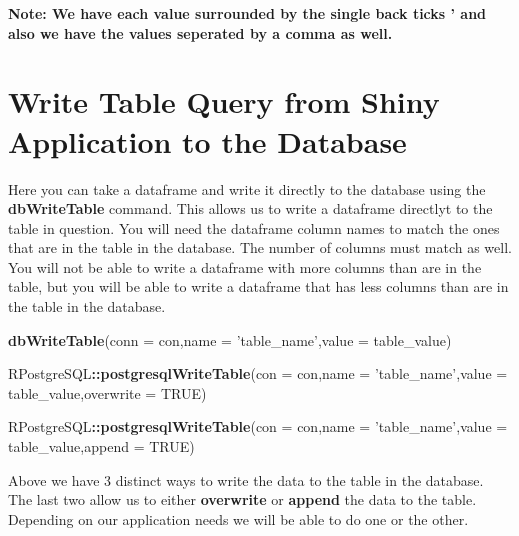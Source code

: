 \documentclass[]{book}
\newenvironment{Shaded}{\begin{snugshade}}{\end{snugshade}}
\newcommand{\KeywordTok}[1]{\textcolor[rgb]{0.13,0.29,0.53}{\textbf{#1}}}
\newcommand{\DataTypeTok}[1]{\textcolor[rgb]{0.13,0.29,0.53}{#1}}
\newcommand{\StringTok}[1]{\textcolor[rgb]{0.31,0.60,0.02}{#1}}
\newcommand{\OtherTok}[1]{\textcolor[rgb]{0.56,0.35,0.01}{#1}}
\newcommand{\OperatorTok}[1]{\textcolor[rgb]{0.81,0.36,0.00}{\textbf{#1}}}
\newcommand{\NormalTok}[1]{#1}
\begin{document}
\begin{Shaded}
\end{Shaded}

\textbf{Note: We have each value surrounded by the single back ticks '
and also we have the values seperated by a comma as well.}

\section{Write Table Query from Shiny Application to the
Database}\label{write-table-query-from-shiny-application-to-the-database}

Here you can take a dataframe and write it directly to the database
using the \textbf{dbWriteTable} command. This allows us to write a
dataframe directlyt to the table in question. You will need the
dataframe column names to match the ones that are in the table in the
database. The number of columns must match as well. You will not be able
to write a dataframe with more columns than are in the table, but you
will be able to write a dataframe that has less columns than are in the
table in the database.

\begin{Shaded}
\begin{Highlighting}[]
\KeywordTok{dbWriteTable}\NormalTok{(}\DataTypeTok{conn =}\NormalTok{ con,}\DataTypeTok{name =} \StringTok{'table_name'}\NormalTok{,}\DataTypeTok{value =}\NormalTok{ table_value)}

\NormalTok{RPostgreSQL}\OperatorTok{::}\KeywordTok{postgresqlWriteTable}\NormalTok{(}\DataTypeTok{con =}\NormalTok{ con,}\DataTypeTok{name =} \StringTok{'table_name'}\NormalTok{,}\DataTypeTok{value =}\NormalTok{ table_value,}\DataTypeTok{overwrite =} \OtherTok{TRUE}\NormalTok{)}

\NormalTok{RPostgreSQL}\OperatorTok{::}\KeywordTok{postgresqlWriteTable}\NormalTok{(}\DataTypeTok{con =}\NormalTok{ con,}\DataTypeTok{name =} \StringTok{'table_name'}\NormalTok{,}\DataTypeTok{value =}\NormalTok{ table_value,}\DataTypeTok{append =} \OtherTok{TRUE}\NormalTok{)}
\end{Highlighting}
\end{Shaded}

Above we have 3 distinct ways to write the data to the table in the
database. The last two allow us to either \textbf{overwrite} or
\textbf{append} the data to the table. Depending on our application
needs we will be able to do one or the other.
\end{document}
